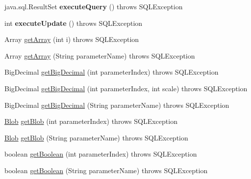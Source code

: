 \begin{DoxyCompactItemize}
\mbox{\label{classcom_1_1mysql_1_1jdbc_1_1_callable_statement_a38b3515c93ff622319d702cb3d6ccb99}} 
java.\+sql.\+Result\+Set {\bfseries execute\+Query} ()  throws S\+Q\+L\+Exception 
\item 
\mbox{\label{classcom_1_1mysql_1_1jdbc_1_1_callable_statement_a736a25740556cf327eb5f3aad2a1270b}} 
int {\bfseries execute\+Update} ()  throws S\+Q\+L\+Exception 
\item 
Array \mbox{\hyperlink{classcom_1_1mysql_1_1jdbc_1_1_callable_statement_a4bbc35f2d808dc379938d9cd02a37ba4}{get\+Array}} (int i)  throws S\+Q\+L\+Exception 
\item 
Array \mbox{\hyperlink{classcom_1_1mysql_1_1jdbc_1_1_callable_statement_a6bc325b24afe0481026e3acedf399d1b}{get\+Array}} (String parameter\+Name)  throws S\+Q\+L\+Exception 
\item 
Big\+Decimal \mbox{\hyperlink{classcom_1_1mysql_1_1jdbc_1_1_callable_statement_a53f2849edb219a3cb6e37e3a0f42a064}{get\+Big\+Decimal}} (int parameter\+Index)  throws S\+Q\+L\+Exception 
\item 
Big\+Decimal \mbox{\hyperlink{classcom_1_1mysql_1_1jdbc_1_1_callable_statement_a0880f0927e476429020989dc3dd5b9ab}{get\+Big\+Decimal}} (int parameter\+Index, int scale)  throws S\+Q\+L\+Exception 
\item 
Big\+Decimal \mbox{\hyperlink{classcom_1_1mysql_1_1jdbc_1_1_callable_statement_a987a3ccf4e6222eaf783b2b5733c5c9b}{get\+Big\+Decimal}} (String parameter\+Name)  throws S\+Q\+L\+Exception 
\item 
\mbox{\hyperlink{classcom_1_1mysql_1_1jdbc_1_1_blob}{Blob}} \mbox{\hyperlink{classcom_1_1mysql_1_1jdbc_1_1_callable_statement_af8971cdeaf8af8b79c32f871e2a6cfe9}{get\+Blob}} (int parameter\+Index)  throws S\+Q\+L\+Exception 
\item 
\mbox{\hyperlink{classcom_1_1mysql_1_1jdbc_1_1_blob}{Blob}} \mbox{\hyperlink{classcom_1_1mysql_1_1jdbc_1_1_callable_statement_a6749653815df64cc270f1148ba0ca2bc}{get\+Blob}} (String parameter\+Name)  throws S\+Q\+L\+Exception 
\item 
boolean \mbox{\hyperlink{classcom_1_1mysql_1_1jdbc_1_1_callable_statement_ad482ae86ec044429a8b799f314138414}{get\+Boolean}} (int parameter\+Index)  throws S\+Q\+L\+Exception 
\item 
boolean \mbox{\hyperlink{classcom_1_1mysql_1_1jdbc_1_1_callable_statement_ad095a4d47834a2d48e932bdeef1ea423}{get\+Boolean}} (String parameter\+Name)  throws S\+Q\+L\+Exception 

\end{DoxyCompactItemize}
